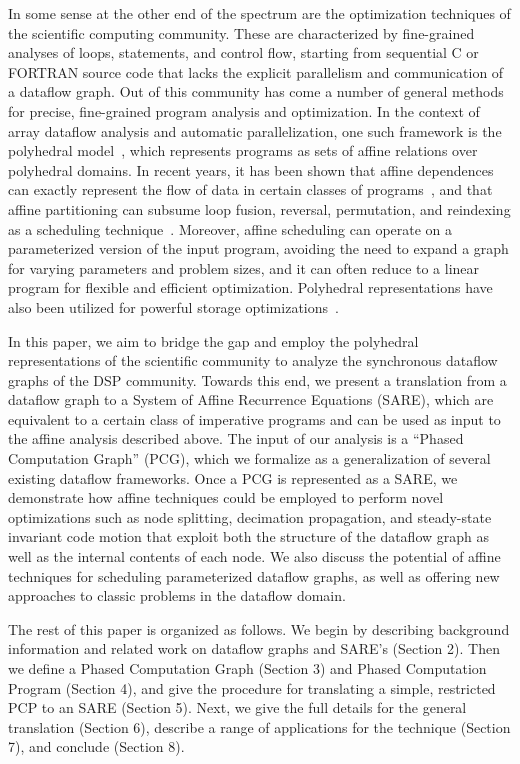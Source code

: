 In some sense at the other end of the spectrum are the optimization
techniques of the scientific computing community.  These are
characterized by fine-grained analyses of loops, statements, and
control flow, starting from sequential C or FORTRAN source code that
lacks the explicit parallelism and communication of a dataflow graph.
Out of this community has come a number of general methods for
precise, fine-grained program analysis and optimization.  In the
context of array dataflow analysis and automatic parallelization, one
such framework is the polyhedral model~\cite{DRV00}, which represents
programs as sets of affine relations over polyhedral domains. In
recent years, it has been shown that affine dependences can exactly
represent the flow of data in certain classes of
programs~\cite{Feautrier92i}, and that affine partitioning can subsume
loop fusion, reversal, permutation, and reindexing as a scheduling
technique~\cite{Lim98}.  Moreover, affine scheduling can operate on a
parameterized version of the input program, avoiding the need to
expand a graph for varying parameters and problem sizes, and it can
often reduce to a linear program for flexible and efficient
optimization.  Polyhedral representations have also been utilized for
powerful storage
optimizations~\cite{Lim01,Quillere,Thies01,Lefebvre98}.

In this paper, we aim to bridge the gap and employ the polyhedral
representations of the scientific community to analyze the synchronous
dataflow graphs of the DSP community.  Towards this end, we present a
translation from a dataflow graph to a System of Affine Recurrence
Equations (SARE), which are equivalent to a certain class of
imperative programs and can be used as input to the affine analysis
described above.  The input of our analysis is a ``Phased Computation
Graph'' (PCG), which we formalize as a generalization of several
existing dataflow frameworks.  Once a PCG is represented as a SARE, we
demonstrate how affine techniques could be employed to perform novel
optimizations such as node splitting, decimation propagation, and
steady-state invariant code motion that exploit both the structure of
the dataflow graph as well as the internal contents of each node.  We
also discuss the potential of affine techniques for scheduling
parameterized dataflow graphs, as well as offering new approaches to
classic problems in the dataflow domain.

The rest of this paper is organized as follows.  We begin by
describing background information and related work on dataflow graphs
and SARE's (Section 2).  Then we define a Phased Computation Graph
(Section 3) and Phased Computation Program (Section 4), and give the
procedure for translating a simple, restricted PCP to an SARE (Section
5).  Next, we give the full details for the general translation
(Section 6), describe a range of applications for the technique
(Section 7), and conclude (Section 8).
